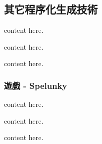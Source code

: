 \subsection{其它程序化生成技術}
\label{ssec:relatedworks-others}

content here.

content here.

content here.

\subsubsection{遊戲 - Spelunky}
\label{sssec:relatedworks-others-spelunky}

content here.

content here.

content here.
